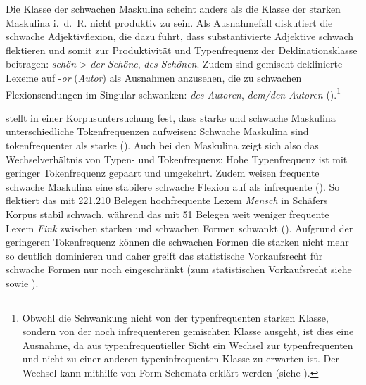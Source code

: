 Die Klasse der schwachen Maskulina scheint anders als die Klasse der starken Maskulina i.~d.~R. nicht produktiv zu sein. Als Ausnahmefall diskutiert \textcite[92--93]{Bittner.20031991} die schwache Adjektivflexion, die dazu führt, dass substantivierte Adjektive schwach flektieren und somit zur Produktivität und Typenfrequenz der Deklinationsklasse beitragen: \textit{schön} > \textit{der Schöne}, \textit{des Schönen}. Zudem sind gemischt-deklinierte Lexeme auf -\textit{or} (\textit{Autor}) als Ausnahmen anzusehen, die zu schwachen Flexionsendungen im Singular schwanken: \textit{des Autoren}, \textit{dem/den Autoren} (\cite[175--176]{Kopcke.1995}).\footnote{Obwohl die Schwankung nicht von der typenfrequenten starken Klasse, sondern von der noch infrequenteren gemischten Klasse ausgeht, ist dies eine Ausnahme, da aus typenfrequentieller Sicht ein Wechsel zur typenfrequenten und nicht zu einer anderen typeninfrequenten Klasse zu erwarten ist. Der Wechsel kann mithilfe von Form-Schemata erklärt werden (siehe ). } 

\textcite{Schafer.2019} stellt in einer Korpusuntersuchung fest, dass starke und schwache Maskulina unterschiedliche Tokenfrequenzen aufweisen: Schwache Maskulina sind tokenfrequenter als starke (\cite[401--402]{Schafer.2019}). Auch bei den Maskulina zeigt sich also das Wechselverhältnis von Typen- und Tokenfrequenz: Hohe Typenfrequenz ist mit geringer Tokenfrequenz gepaart und umgekehrt. Zudem weisen frequente schwache Maskulina eine stabilere schwache Flexion auf als infrequente (\cite[404--405]{Schafer.2019}). So flektiert das mit 221.210 Belegen hochfrequente Lexem \textit{Mensch} in Schäfers Korpus stabil schwach, während das mit 51 Belegen weit weniger frequente Lexem \textit{Fink} zwischen starken und schwachen Formen schwankt (\cite[410--411]{Schafer.2019}). Aufgrund der geringeren Tokenfrequenz können die schwachen Formen die starken nicht mehr so deutlich dominieren und daher greift das statistische Vorkaufsrecht für schwache Formen nur noch eingeschränkt (zum statistischen Vorkaufsrecht siehe \cite[74--94]{Goldberg.2019} sowie ).  

